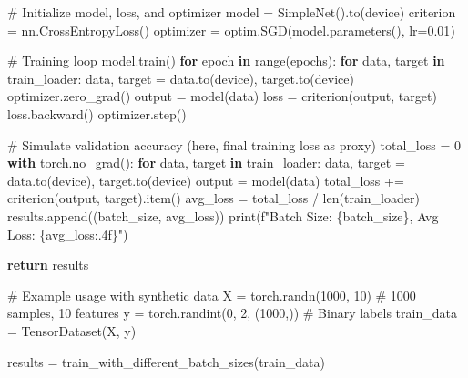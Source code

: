 \documentclass[
  letterpaper,
  DIV=11,
  numbers=noendperiod]{scrreprt}
\newenvironment{Shaded}{\begin{snugshade}}{\end{snugshade}}
\newcommand{\BuiltInTok}[1]{\textcolor[rgb]{0.00,0.23,0.31}{#1}}
\newcommand{\CommentTok}[1]{\textcolor[rgb]{0.37,0.37,0.37}{#1}}
\newcommand{\ControlFlowTok}[1]{\textcolor[rgb]{0.00,0.23,0.31}{\textbf{#1}}}
\newcommand{\DecValTok}[1]{\textcolor[rgb]{0.68,0.00,0.00}{#1}}
\newcommand{\FloatTok}[1]{\textcolor[rgb]{0.68,0.00,0.00}{#1}}
\newcommand{\KeywordTok}[1]{\textcolor[rgb]{0.00,0.23,0.31}{\textbf{#1}}}
\newcommand{\NormalTok}[1]{\textcolor[rgb]{0.00,0.23,0.31}{#1}}
\newcommand{\OperatorTok}[1]{\textcolor[rgb]{0.37,0.37,0.37}{#1}}
\newcommand{\SpecialCharTok}[1]{\textcolor[rgb]{0.37,0.37,0.37}{#1}}
\newcommand{\SpecialStringTok}[1]{\textcolor[rgb]{0.13,0.47,0.30}{#1}}
\begin{document}
\begin{Shaded}
\begin{Highlighting}[]
        \CommentTok{\# Initialize model, loss, and optimizer}
\NormalTok{        model }\OperatorTok{=}\NormalTok{ SimpleNet().to(device)}
\NormalTok{        criterion }\OperatorTok{=}\NormalTok{ nn.CrossEntropyLoss()}
\NormalTok{        optimizer }\OperatorTok{=}\NormalTok{ optim.SGD(model.parameters(), lr}\OperatorTok{=}\FloatTok{0.01}\NormalTok{)}

        \CommentTok{\# Training loop}
\NormalTok{        model.train()}
        \ControlFlowTok{for}\NormalTok{ epoch }\KeywordTok{in} \BuiltInTok{range}\NormalTok{(epochs):}
            \ControlFlowTok{for}\NormalTok{ data, target }\KeywordTok{in}\NormalTok{ train\_loader:}
\NormalTok{                data, target }\OperatorTok{=}\NormalTok{ data.to(device), target.to(device)}
\NormalTok{                optimizer.zero\_grad()}
\NormalTok{                output }\OperatorTok{=}\NormalTok{ model(data)}
\NormalTok{                loss }\OperatorTok{=}\NormalTok{ criterion(output, target)}
\NormalTok{                loss.backward()}
\NormalTok{                optimizer.step()}

        \CommentTok{\# Simulate validation accuracy (here, final training loss as proxy)}
\NormalTok{        total\_loss }\OperatorTok{=} \DecValTok{0}
        \ControlFlowTok{with}\NormalTok{ torch.no\_grad():}
            \ControlFlowTok{for}\NormalTok{ data, target }\KeywordTok{in}\NormalTok{ train\_loader:}
\NormalTok{                data, target }\OperatorTok{=}\NormalTok{ data.to(device), target.to(device)}
\NormalTok{                output }\OperatorTok{=}\NormalTok{ model(data)}
\NormalTok{                total\_loss }\OperatorTok{+=}\NormalTok{ criterion(output, target).item()}
\NormalTok{        avg\_loss }\OperatorTok{=}\NormalTok{ total\_loss }\OperatorTok{/} \BuiltInTok{len}\NormalTok{(train\_loader)}
\NormalTok{        results.append((batch\_size, avg\_loss))}
        \BuiltInTok{print}\NormalTok{(}\SpecialStringTok{f"Batch Size: }\SpecialCharTok{\{}\NormalTok{batch\_size}\SpecialCharTok{\}}\SpecialStringTok{, Avg Loss: }\SpecialCharTok{\{}\NormalTok{avg\_loss}\SpecialCharTok{:.4f\}}\SpecialStringTok{"}\NormalTok{)       }

    \ControlFlowTok{return}\NormalTok{ results}

\CommentTok{\# Example usage with synthetic data}
\NormalTok{X }\OperatorTok{=}\NormalTok{ torch.randn(}\DecValTok{1000}\NormalTok{, }\DecValTok{10}\NormalTok{)  }\CommentTok{\# 1000 samples, 10 features}
\NormalTok{y }\OperatorTok{=}\NormalTok{ torch.randint(}\DecValTok{0}\NormalTok{, }\DecValTok{2}\NormalTok{, (}\DecValTok{1000}\NormalTok{,))  }\CommentTok{\# Binary labels}
\NormalTok{train\_data }\OperatorTok{=}\NormalTok{ TensorDataset(X, y)}

\NormalTok{results }\OperatorTok{=}\NormalTok{ train\_with\_different\_batch\_sizes(train\_data)}
\end{Highlighting}
\end{Shaded}
\end{document}

